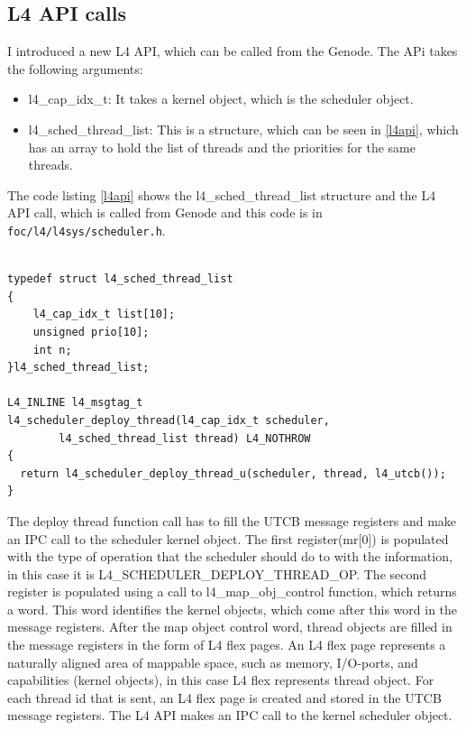 \subsection{L4 API calls} \label{imp:l4api}
I introduced a new L4 API, which can be called from the Genode. The APi takes the following arguments:

\begin{itemize}
\item l4\_cap\_idx\_t: It takes a kernel object, which is the scheduler object.  

\item l4\_sched\_thread\_list: This is a structure, which can be seen in \ref{l4api}, which has an array to hold the list of threads and the priorities for the same threads. 

\end{itemize}

The code listing  \ref{l4api} shows the l4\_sched\_thread\_list structure and the L4 API call, which is called from Genode and this code is in \texttt{foc/l4/l4sys/scheduler.h}.
\begin{lstlisting}[caption={L4 scheduler API in scheduler.h},label={l4api}, style=customcpp]

typedef struct l4_sched_thread_list
{
	l4_cap_idx_t list[10];
	unsigned prio[10];
	int n;
}l4_sched_thread_list;

L4_INLINE l4_msgtag_t
l4_scheduler_deploy_thread(l4_cap_idx_t scheduler,
		l4_sched_thread_list thread) L4_NOTHROW
{
  return l4_scheduler_deploy_thread_u(scheduler, thread, l4_utcb());
}
\end{lstlisting}

The deploy thread function call has to fill the UTCB message registers and make an IPC call to the scheduler kernel object. The first register(mr[0]) is populated with the type of operation that the scheduler should do to with the information, in this case it is L4\_SCHEDULER\_DEPLOY\_THREAD\_OP. The second register is populated using a call to l4\_map\_obj\_control function, which returns a word. This word identifies the kernel objects, which come after this word in the message registers. After the map object control word, thread objects are filled in the message registers in the form of L4 flex pages. An L4 flex page represents a naturally aligned area of mappable space, such as memory, I/O-ports, and capabilities (kernel objects), in this case L4 flex represents thread object.
For each thread id that is sent, an L4 flex page is created and stored in the UTCB message registers. The L4 API makes an IPC call to the kernel scheduler object. 

